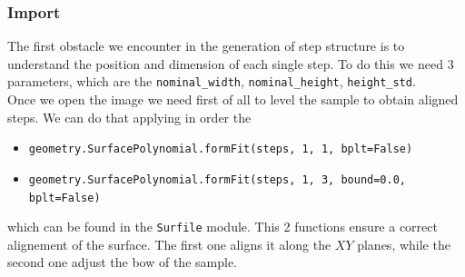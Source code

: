 \documentclass{article}
\begin{document}
\subsubsection{Import}\label{subsubsec:Import}
The first obstacle we encounter in the generation of step structure is to understand the position and dimension of each single step.
To do this we need 3 parameters, which are the \texttt{nominal\_width}, \texttt{nominal\_height}, \texttt{height\_std}.
\\[.5cm]
Once we open the image we need first of all to level the sample to obtain aligned steps. We can do that applying in order the 
\begin{itemize}
    \item \texttt{geometry.SurfacePolynomial.formFit(steps, 1, 1, bplt=False)} 
    \item \texttt{geometry.SurfacePolynomial.formFit(steps, 1, 3, bound=0.0, bplt=False)}
\end{itemize}
which can be found in the \texttt{Surfile} module. This 2 functions ensure a correct alignement of the surface. The first one aligns it along the $XY$ planes, while the second one adjust the bow of the sample.
\end{document}
